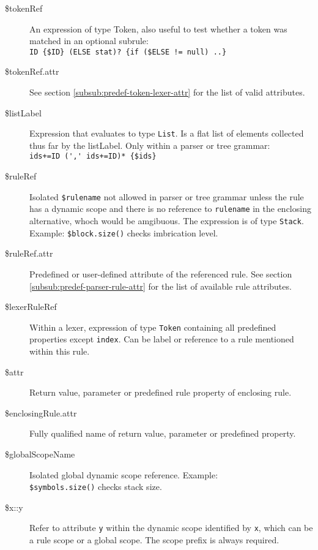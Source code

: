 \begin{description}
\item[\$tokenRef]
An expression of type Token,
also useful to test whether a token was matched in an optional subrule:\\
\verb|ID {$ID} (ELSE stat)? {if ($ELSE != null) ..}|

\item[\$tokenRef.attr]
See section \ref{subsub:predef-token-lexer-attr}
for the list of valid attributes.

\item[\$listLabel]
Expression that evaluates to type \verb=List=.
Is a flat list of elements collected thus far by the listLabel.
Only within a parser or tree grammar:\\
\verb|ids+=ID (',' ids+=ID)* {$ids}|

\item[\$ruleRef]
Isolated \verb|$rulename| not allowed in parser or tree grammar unless
the rule has a dynamic scope and there is no reference to \verb=rulename=
in the enclosing alternative, whoch would be amgibuous.
The expression is of type \verb=Stack=. Example:
\verb|$block.size()| checks imbrication level.

\item[\$ruleRef.attr]
Predefined or user-defined attribute of the referenced rule.
See section \ref{subsub:predef-parser-rule-attr}
for the list of available rule attributes.

\item[\$lexerRuleRef]
Within a lexer, expression of type \verb=Token=
containing all predefined properties except \verb=index=.
Can be label or reference to a rule mentioned within this rule.

\item[\$attr]
Return value, parameter or predefined rule property of enclosing rule.

\item[\$enclosingRule.attr]
Fully qualified name of return value, parameter or predefined property.

\item[\$globalScopeName]
Isolated global dynamic scope reference. Example:\\
\verb=$symbols.size()= checks stack size.

\item[\$x::y]
Refer to attribute \verb=y= within the dynamic scope identified by \verb=x=,
which can be a rule scope or a global scope.
The scope prefix is always required.


\end{description}

